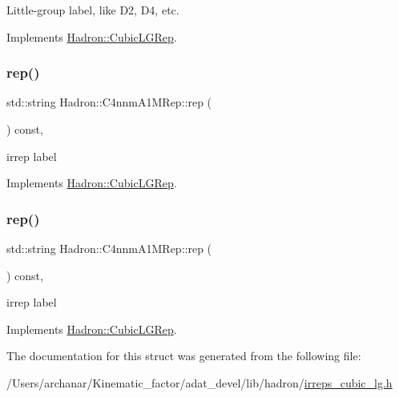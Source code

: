 Little-\/group label, like D2, D4, etc. 

Implements \mbox{\hyperlink{structHadron_1_1CubicLGRep_a9bdb14b519a611d21379ed96a3a9eb41}{Hadron\+::\+Cubic\+L\+G\+Rep}}.

\mbox{\label{structHadron_1_1C4nnmA1MRep_af64812449271d9ce89fbba35fc41f7b7}} 
\subsubsection{\texorpdfstring{rep()}{rep()}\hspace{0.1cm}{\footnotesize\ttfamily [1/2]}}
{\footnotesize\ttfamily std\+::string Hadron\+::\+C4nnm\+A1\+M\+Rep\+::rep (\begin{DoxyParamCaption}{ }\end{DoxyParamCaption}) const\hspace{0.3cm}{\ttfamily [inline]}, {\ttfamily [virtual]}}

irrep label 

Implements \mbox{\hyperlink{structHadron_1_1CubicLGRep_a50f5ddbb8f4be4cee0106fa9e8c75e6c}{Hadron\+::\+Cubic\+L\+G\+Rep}}.

\mbox{\label{structHadron_1_1C4nnmA1MRep_af64812449271d9ce89fbba35fc41f7b7}} 
\subsubsection{\texorpdfstring{rep()}{rep()}\hspace{0.1cm}{\footnotesize\ttfamily [2/2]}}
{\footnotesize\ttfamily std\+::string Hadron\+::\+C4nnm\+A1\+M\+Rep\+::rep (\begin{DoxyParamCaption}{ }\end{DoxyParamCaption}) const\hspace{0.3cm}{\ttfamily [inline]}, {\ttfamily [virtual]}}

irrep label 

Implements \mbox{\hyperlink{structHadron_1_1CubicLGRep_a50f5ddbb8f4be4cee0106fa9e8c75e6c}{Hadron\+::\+Cubic\+L\+G\+Rep}}.



The documentation for this struct was generated from the following file\+:\begin{DoxyCompactItemize}
\item 
/\+Users/archanar/\+Kinematic\+\_\+factor/adat\+\_\+devel/lib/hadron/\mbox{\hyperlink{lib_2hadron_2irreps__cubic__lg_8h}{irreps\+\_\+cubic\+\_\+lg.\+h}}\end{DoxyCompactItemize}

